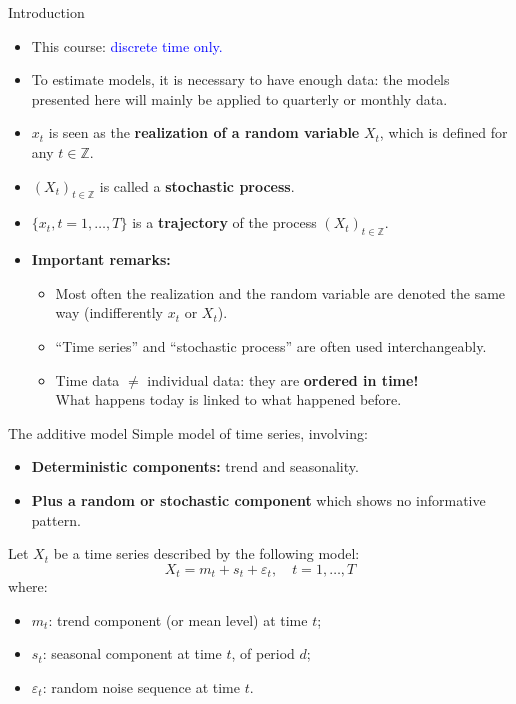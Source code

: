 \documentclass{beamer}
\begin{document}
\begin{frame}{Introduction}
\begin{itemize}
    \item This course: \textcolor{blue}{discrete time only.}
    \vspace{0.2cm}
    \item To estimate models, it is necessary to have enough data: the models presented here will mainly be applied to quarterly or monthly data.
    \vspace{0.2cm}
    \item $x_t$ is seen as the \textbf{realization of a random variable} $X_t$, which is defined for any $t \in \mathbb{Z}$.
    \vspace{0.2cm}
    \item $(X_t)_{t \in \mathbb{Z}}$ is called a \textbf{stochastic process}.
    \vspace{0.2cm}
    \item $\{x_t, t = 1, \ldots, T\}$ is a \textbf{trajectory} of the process $(X_t)_{t \in \mathbb{Z}}$.
    \vspace{0.3cm}
    \item \textbf{Important remarks:}
    \begin{itemize}
        \item Most often the realization and the random variable are denoted the same way (indifferently $x_t$ or $X_t$).
        \item “Time series” and “stochastic process” are often used interchangeably.
        \item Time data $\neq$ individual data: they are \textbf{ordered in time!} \\
        What happens today is linked to what happened before.
    \end{itemize}
\end{itemize}
\end{frame}

\begin{frame}{The additive model}
\small
Simple model of time series, involving:
\begin{itemize}
  \item \textbf{Deterministic components:} trend and seasonality.
  \item \textbf{Plus a random or stochastic component} which shows no informative pattern.
\end{itemize}

\medskip
Let $X_t$ be a time series described by the following model:
\[
X_t = m_t + s_t + \varepsilon_t, \quad t = 1, \ldots, T
\]
where:
\begin{itemize}
  \item $m_t$: trend component (or mean level) at time $t$;
  \item $s_t$: seasonal component at time $t$, of period $d$;
  \item $\varepsilon_t$: random noise sequence at time $t$.
\end{itemize}
\end{frame}
\end{document}
